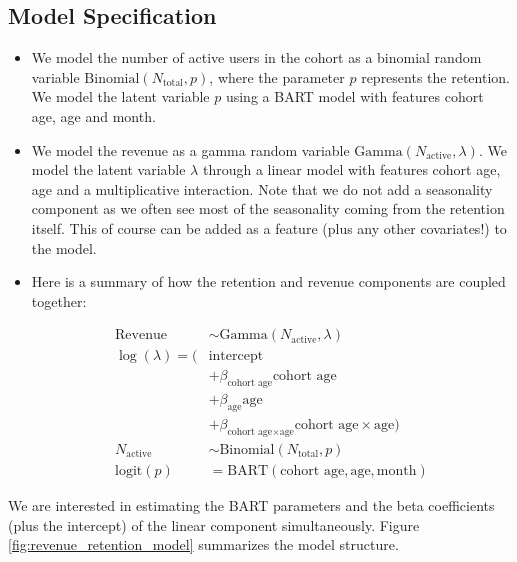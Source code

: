 \documentclass[11pt]{amsart}
\begin{document}
\subsection*{Model Specification} 
\begin{itemize}
    \item We model the number of active users in the cohort as a binomial random
        variable $\text{Binomial}(N_{\text{total}}, p)$, where the parameter $p$
        represents the retention. We model the latent variable $p$ using a BART model
        with features cohort age, age and month.
    
    \item We model the revenue as a gamma random variable
        $\text{Gamma}(N_{\text{active}}, \lambda)$. We model the latent variable
        $\lambda$ through a linear model with features cohort age, age and a
        multiplicative interaction. Note that we do not add a seasonality component as
        we often see most of the seasonality coming from the retention itself. This of
        course can be added as a feature (plus any other covariates!) to the model.
    
    \item Here is a summary of how the retention and revenue components are coupled
        together:
    
    \begin{align*}
        \text{Revenue} & \sim \text{Gamma}(N_{\text{active}}, \lambda) \\
        \log(\lambda) = (& \text{intercept} \\
            & + \beta_{\text{cohort age}} \text{cohort age} \\
            & + \beta_{\text{age}} \text{age} \\
            & + \beta_{\text{cohort age} \times \text{age}} \text{cohort age} \times \text{age}) \\
        N_{\text{active}} & \sim \text{Binomial}(N_{\text{total}}, p) \\
        \textrm{logit}(p) & = \text{BART}(\text{cohort age}, \text{age}, \text{month})
    \end{align*}
    
\end{itemize}

We are interested in estimating the BART parameters and the beta coefficients (plus the
intercept) of the linear component simultaneously. Figure
\ref{fig:revenue_retention_model} summarizes the model structure.
\end{document}
